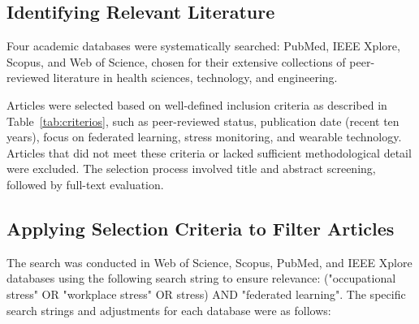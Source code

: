 \documentclass[12pt]{article}
\begin{document}
\subsection{Identifying Relevant Literature}


Four academic databases were systematically searched: PubMed, IEEE Xplore, Scopus, and Web of Science, chosen for their extensive collections of peer-reviewed literature in health sciences, technology, and engineering. 

Articles were selected based on well-defined inclusion criteria as described in Table~\ref{tab:criterios}, such as peer-reviewed status, publication date (recent ten years), focus on federated learning, stress monitoring, and wearable technology. Articles that did not meet these criteria or lacked sufficient methodological detail were excluded. The selection process involved title and abstract screening, followed by full-text evaluation.

\begin{table}[htbp]
\centering
\caption{Inclusion and Exclusion Criteria}
\label{tab:criterios}
\end{table}

\subsection{Applying Selection Criteria to Filter Articles}

The search was conducted in Web of Science, Scopus, PubMed, and IEEE Xplore databases using the following search string to ensure relevance: ("occupational stress" OR "workplace stress" OR stress) AND "federated learning". The specific search strings and adjustments for each database were as follows:
\end{document}
